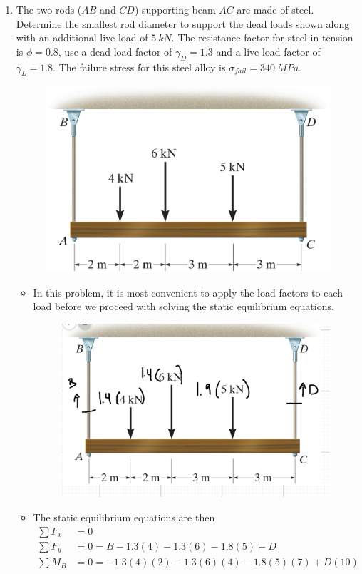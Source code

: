 \documentclass[12pt, oneside]{article}
\begin{document}
\begin{enumerate}
	\item %
		The two rods ($AB$ and $CD$) supporting beam $AC$ are made of steel.
		Determine the smallest rod diameter to support the dead loads shown along with an additional live load of $\SI{5}{kN}$.
		The resistance factor for steel in tension is $\phi=0.8$, use a dead load factor of $\gamma_D = 1.3$ and a live load factor of $\gamma_L = 1.8$.
		The failure stress for this steel alloy is $\sigma_{fail} = \SI{340}{MPa}$.
		\begin{figure}[H]
			\centering
			\includegraphics[width=0.6\linewidth]{hangingbeam}
			\label{fig:hangingbeam}
		\end{figure}
		\begin{itemize}
			\item In this problem, it is most convenient to apply the load factors to each load before we proceed with solving the static equilibrium equations.
			\begin{figure}[H]
				\centering
				\includegraphics[width=0.7\linewidth]{hw1-7}
			\end{figure}
		\item The static equilibrium equations are then
		\begin{align*}
			\sum F_x &= 0\\
			\sum F_y &= 0 = B - 1.3(4) - 1.3(6) - 1.8(5) + D\\
			\sum M_B &= 0 = -1.3(4)(2) - 1.3(6)(4) - 1.8(5)(7) + D(10)\\

\end{align*}
\end{itemize}
\end{enumerate}
\end{document}
